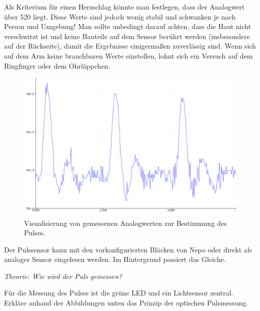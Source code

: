 Als Kriterium für einen Herzschlag könnte man festlegen, dass der Analogwert über 520 liegt. Diese Werte sind jedoch wenig stabil und schwanken je nach Person und Umgebung! Man sollte unbedingt darauf achten, dass die Haut nicht verschwitzt ist und keine Bauteile auf dem Sensor berührt werden (insbesondere auf der Rückseite), damit die Ergebnisse einigermaßen zuverlässig sind. Wenn sich auf dem Arm keine brauchbaren Werte einstellen, lohnt sich ein Versuch auf dem Ringfinger oder dem Ohrläppchen.
\begin{figure}[H]
	\centering
	\includegraphics[width=\textwidth]{./pics/pulsmessung-serieller-plotter.png}
	\caption{Visualisierung von gemessenen Analogwerten zur Bestimmung des Pulses.}
	\label{abb:pulsmessung-serieller-plotter}
\end{figure}

Der Pulssensor kann mit den vorkonfigurierten Blöcken von Nepo oder direkt als analoger Sensor eingelesen werden. Im Hintergrund passiert das Gleiche.

\begin{aufgabe} \emph{Theorie: Wie wird der Puls gemessen?}
	
	Für die Messung des Pulses ist die grüne LED und ein Lichtsensor zentral. Erkläre anhand der Abbildungen unten das Prinzip der optischen Pulsmessung.
\end{aufgabe}

